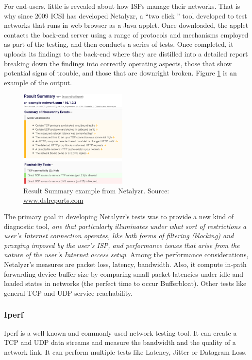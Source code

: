 For end-users, little is revealed about how ISPs manage their networks. That is
why since 2009 ICSI has developed Netalyzr, a ``two click '' tool developed to
test networks that runs in web browser as a Java applet. Once downloaded, the
applet contacts the back-end server using a range of protocols and mechanisms
employed as part of the testing, and then conducts a series of tests. Once
completed, it uploads its findings to the back-end where they are distilled
into a detailed report breaking down the findings into correctly operating
aspects, those that show potential signs of trouble, and those that are
downright broken. Figure \ref{netalyzr_ex} is an example of the output.

\begin{figure}
	\begin{center}
		\includegraphics[width=0.48\textwidth]{img/netalyzr_ex}
	\end{center}
	\caption[Result Summary example from Netalyzr]{Result Summary example from Netalyzr. Source:
	\url{www.dslreports.com}}   
	\label{netalyzr_ex} 
\end{figure}

The primary goal in developing Netalyzr's tests was to provide a new kind of
diagnostic tool, \textit{one that particularly illuminates under what sort of
restrictions a user's Internet connection operates, like both forms of filtering
(blocking) and proxying imposed by the user's ISP, and performance issues that
arise from the nature of the user's Internet access setup}\cite{netalyzr}. Among
the performance considerations, Netalyzr's measures are packet loss, latency,
bandwidth. Also, it compute in-path forwarding device buffer size by comparing
small-packet latencies under idle and loaded states in networks (the perfect
time to occur Bufferbloat). Other tests like general TCP and UDP service
reachability.

\subsubsection{Iperf}
Iperf is a well known and commonly used network testing tool. It can create a
TCP and UDP data streams and measure the bandwidth and the quality of a network
link. It can perform multiple tests like Latency, Jitter or Datagram Loss.

